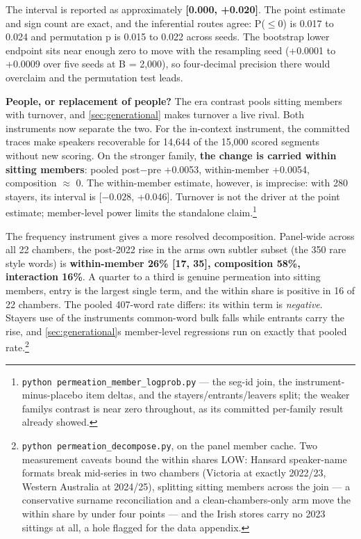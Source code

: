 The interval is reported as approximately \textbf{{[}0.000, +0.020{]}}. The point
estimate and sign count are exact, and the inferential routes agree: P(\(\leq\)0) is
0.017 to 0.024 and permutation p is 0.015 to 0.022 across seeds. The bootstrap
lower endpoint sits near enough zero to move with the resampling seed (+0.0001
to +0.0009 over five seeds at B = 2,000), so four-decimal precision there would
overclaim and the permutation test leads.

\textbf{People, or replacement of people?} The era contrast pools sitting
members with turnover, and \cref{sec:generational} makes turnover a live rival. Both
instruments now separate the two. For the in-context instrument, the
committed traces make speakers recoverable for 14,644 of the 15,000 scored
segments without new scoring. On the stronger family, \textbf{the change is
carried within sitting members}: pooled post\(-\)pre +0.0053, within-member
+0.0054, composition \(\approx\) 0. The within-member estimate, however, is imprecise:
with 280 stayers, its interval is {[}\(-0.028\), +0.046{]}. Turnover is not the
driver at the point estimate; member-level power limits the standalone
claim.\footnote{\texttt{python\ permeation\_\allowbreak{}member\_\allowbreak{}logprob.\allowbreak{}py} --- the seg-id join, the
  instrument-minus-placebo item deltas, and the stayers/entrants/leavers
  split; the weaker family\textquotesingle s contrast is near zero throughout, as its
  committed per-family result already showed.}

The frequency instrument gives a more resolved decomposition. Panel-wide
across all 22 chambers, the post-2022 rise in the arm\textquotesingle s own subtler subset
(the 350 rare style words) is \textbf{within-member 26\% {[}17, 35{]}, composition 58\%,
interaction 16\%}. A quarter to a third is genuine permeation into sitting
members, entry is the largest single term, and the within share is positive
in 16 of 22 chambers. The pooled 407-word rate differs: its within term is
\emph{negative}. Stayers\textquotesingle{} use of the instrument\textquotesingle s common-word bulk falls while
entrants carry the rise, and \cref{sec:generational}\textquotesingle s member-level regressions run on exactly
that pooled rate.\footnote{\texttt{python\ permeation\_\allowbreak{}decompose.\allowbreak{}py}, on the panel member cache.
  Two measurement caveats bound the within shares LOW: Hansard
  speaker-name formats break mid-series in two chambers (Victoria at
  exactly 2022/23, Western Australia at 2024/25), splitting sitting
  members across the join --- a conservative surname reconciliation and a
  clean-chambers-only arm move the within share by under four points ---
  and the Irish stores carry no 2023 sittings at all, a hole flagged for
  the data appendix.}

